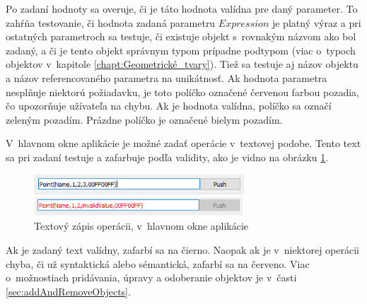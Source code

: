 Po zadaní hodnoty sa overuje, či je táto hodnota valídna pre daný parameter. To zahŕňa testovanie, či hodnota zadaná parametru $Expression$ je platný výraz a pri ostatných parametroch sa testuje, či existuje objekt s~rovnakým názvom ako bol zadaný, a či je tento objekt správnym typom prípadne podtypom (viac o~typoch objektov v~kapitole  \ref{chapt:Geometrické_tvary}). Tiež sa testuje aj názov objektu a názov referencovaného parametra na unikátnosť.
Ak hodnota parametra nesplňuje niektorú požiadavku, je toto políčko označené červenou farbou pozadia, čo upozorňuje užívateľa na chybu. Ak je hodnota valídna, políčko sa označí zeleným pozadím. Prázdne políčko je označené bielym pozadím. 

V~hlavnom okne aplikácie je možné zadať operácie v~textovej podobe. Tento text sa pri zadaní testuje a zafarbuje podľa validity, ako je vidno na obrázku \ref{fig:text}. 
\begin{figure}[H]
	\centering
	\includegraphics[width=0.7\textwidth]{obrazky-figures/operations text.png}
	\caption{Textový zápis operácii, v~hlavnom okne aplikácie}
	\label{fig:text}
\end{figure}
Ak je zadaný text valídny, zafarbí sa na čierno. Naopak ak je v~niektorej operácii chyba, či už syntaktická alebo sémantická, zafarbí sa na červeno. Viac o~možnostiach pridávania, úpravy a odoberanie objektov je v~časti \ref{sec:addAndRemoveObjects}.





